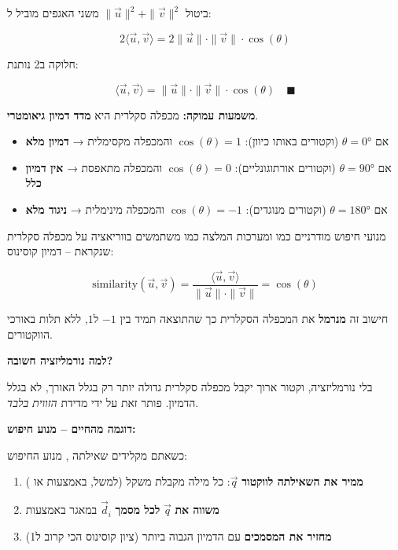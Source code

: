 ביטול $\|\vec{u}\|^2 + \|\vec{v}\|^2$ משני האגפים מוביל ל:

\[
\num{2}\langle \vec{u}, \vec{v} \rangle = \num{2}\|\vec{u}\| \cdot \|\vec{v}\| \cdot \cos(\theta)
\]

חלוקה ב\en{-}\num{2} נותנת:

\[
\langle \vec{u}, \vec{v} \rangle = \|\vec{u}\| \cdot \|\vec{v}\| \cdot \cos(\theta) \quad \blacksquare
\]

\textbf{משמעות עמוקה:} מכפלה סקלרית היא \textbf{מדד דמיון גיאומטרי}.

\begin{itemize}
\item אם $\theta = \num{0}°$ (וקטורים באותו כיוון): $\cos(\theta) = \num{1}$ והמכפלה מקסימלית → \textbf{דמיון מלא}
\item אם $\theta = \num{90}°$ (וקטורים אורתוגונליים): $\cos(\theta) = \num{0}$ והמכפלה מתאפסת → \textbf{אין דמיון כלל}
\item אם $\theta = \num{180}°$ (וקטורים מנוגדים): $\cos(\theta) = \num{-1}$ והמכפלה מינימלית → \textbf{ניגוד מלא}
\end{itemize}


מנועי חיפוש מודרניים כמו  ומערכות המלצה כמו  משתמשים בווריאציה על מכפלה סקלרית שנקראת \textbf{} – דמיון קוסינוס:

\begin{equation}
\text{similarity}(\vec{u}, \vec{v}) = \frac{\langle \vec{u}, \vec{v} \rangle}{\|\vec{u}\| \cdot \|\vec{v}\|} = \cos(\theta)
\end{equation}

חישוב זה \textbf{מנרמל} את המכפלה הסקלרית כך שהתוצאה תמיד בין $\num{-1}$ ל\en{-}$\num{+1}$, ללא תלות באורכי הווקטורים.

\textbf{למה נורמליזציה חשובה?}

בלי נורמליזציה, וקטור ארוך יקבל מכפלה סקלרית גדולה יותר רק בגלל האורך, לא בגלל הדמיון.  פותר זאת על ידי מדידת \textit{הזווית בלבד}.

\textbf{דוגמה מהחיים – מנוע חיפוש:}

כשאתם מקלידים שאילתה , מנוע החיפוש:

\begin{enumerate}
\item \textbf{ממיר את השאילתה לווקטור} $\vec{q}$: כל מילה מקבלת משקל (למשל, באמצעות  או  \cite{mikolov2013})
\item \textbf{משווה את} $\vec{q}$ \textbf{לכל מסמך} $\vec{d}_i$ במאגר באמצעות 
\item \textbf{מחזיר את המסמכים} עם הדמיון הגבוה ביותר (ציון קוסינוס הכי קרוב ל\en{-}\num{1})
\end{enumerate}

